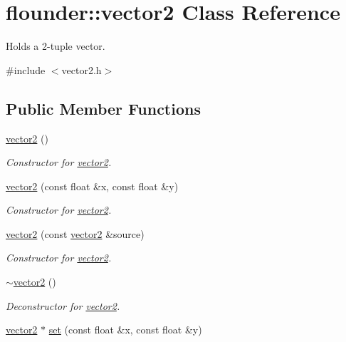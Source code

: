 \hypertarget{classflounder_1_1vector2}{}\section{flounder\+:\+:vector2 Class Reference}
\label{classflounder_1_1vector2}


Holds a 2-\/tuple vector.  




{\ttfamily \#include $<$vector2.\+h$>$}

\subsection*{Public Member Functions}
\begin{DoxyCompactItemize}
\item 
\hyperlink{classflounder_1_1vector2_add30cfbc22d19411719748238464aa18}{vector2} ()
\begin{DoxyCompactList}\small\item\em Constructor for \hyperlink{classflounder_1_1vector2}{vector2}. \end{DoxyCompactList}\item 
\hyperlink{classflounder_1_1vector2_aa15bf8af059379616c8bc98ab425c890}{vector2} (const float \&x, const float \&y)
\begin{DoxyCompactList}\small\item\em Constructor for \hyperlink{classflounder_1_1vector2}{vector2}. \end{DoxyCompactList}\item 
\hyperlink{classflounder_1_1vector2_a7eb96dd51870fa69b53d293bdabfe1ac}{vector2} (const \hyperlink{classflounder_1_1vector2}{vector2} \&source)
\begin{DoxyCompactList}\small\item\em Constructor for \hyperlink{classflounder_1_1vector2}{vector2}. \end{DoxyCompactList}\item 
\hyperlink{classflounder_1_1vector2_a3bd2a39809e616ae35bc0de0079894af}{$\sim$vector2} ()
\begin{DoxyCompactList}\small\item\em Deconstructor for \hyperlink{classflounder_1_1vector2}{vector2}. \end{DoxyCompactList}\item 
\hyperlink{classflounder_1_1vector2}{vector2} $\ast$ \hyperlink{classflounder_1_1vector2_a2e109e2936a8573b46e0f76f068debaa}{set} (const float \&x, const float \&y)

\end{DoxyCompactItemize}
